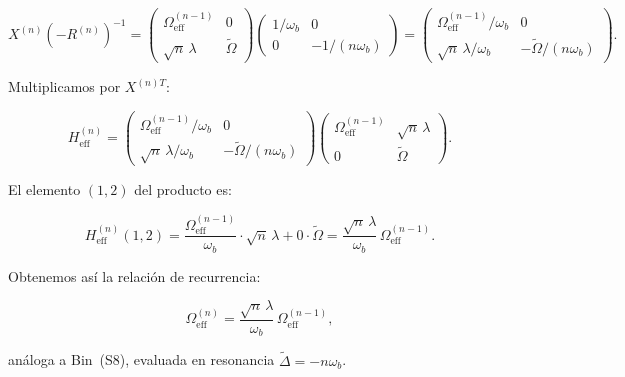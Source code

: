 \documentclass[12pt]{article}
\begin{document}
	\begin{equation}
		X^{(n)}\!\left(-R^{(n)}\right)^{-1}
		= \begin{pmatrix}
			\Omega_{\mathrm{eff}}^{(n-1)} & 0 \\[4pt]
			\sqrt{n}\,\lambda & \widetilde{\Omega}
		\end{pmatrix}
		\begin{pmatrix} 1/\omega_b & 0 \\ 0 & -1/(n\omega_b) \end{pmatrix}
		= \begin{pmatrix}
			\Omega_{\mathrm{eff}}^{(n-1)}/\omega_b & 0 \\[4pt]
			\sqrt{n}\,\lambda/\omega_b & -\widetilde{\Omega}/(n\omega_b)
		\end{pmatrix}.
	\end{equation}
	
	\noindent
	Multiplicamos por $X^{(n)T}$:
	
	\begin{equation}
		H_{\mathrm{eff}}^{(n)}
		= \begin{pmatrix}
			\Omega_{\mathrm{eff}}^{(n-1)}/\omega_b & 0 \\[4pt]
			\sqrt{n}\,\lambda/\omega_b & -\widetilde{\Omega}/(n\omega_b)
		\end{pmatrix}
		\begin{pmatrix}
			\Omega_{\mathrm{eff}}^{(n-1)} & \sqrt{n}\,\lambda \\[4pt]
			0 & \widetilde{\Omega}
		\end{pmatrix}.
	\end{equation}
	
	\noindent
	El elemento $(1,2)$ del producto es:
	
	\begin{equation}
		H_{\mathrm{eff}}^{(n)}(1,2)
		= \frac{\Omega_{\mathrm{eff}}^{(n-1)}}{\omega_b}\cdot\sqrt{n}\,\lambda
		+ 0\cdot\widetilde{\Omega}
		= \frac{\sqrt{n}\,\lambda}{\omega_b}\,\Omega_{\mathrm{eff}}^{(n-1)}.
	\end{equation}
	
	\noindent
	Obtenemos as\'i la relaci\'on de recurrencia:
	
	\begin{equation}
		\boxed{
			\Omega_{\mathrm{eff}}^{(n)} = \frac{\sqrt{n}\,\lambda}{\omega_b}\,
			\Omega_{\mathrm{eff}}^{(n-1)},
		}
		\label{eq:recurrencia}
	\end{equation}
	
	an\'aloga a Bin~(S8), evaluada en resonancia $\widetilde{\Delta} = -n\omega_b$.
	
\end{document}
